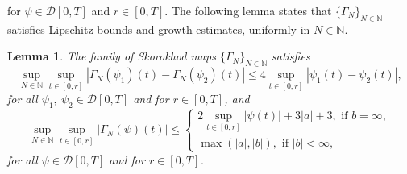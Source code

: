 \documentclass[11pt]{amsart}
\newtheorem{lemma}[theorem]{Lemma}
\begin{document}
{\begin{equation*}
\end{equation*}
for $\psi \in \mathcal{D}[0,T]$ and $r \in [0,T]$. The following lemma states that $\{ \Gamma_{N} \}_{N \in \mathbb{N}}$ satisfies Lipschitz bounds and growth estimates, uniformly in $N \in \mathbb{N}$.
\begin{lemma}\label{lem:GNLipGB}
The family of Skorokhod maps $\{ \Gamma_{N} \}_{N \in \mathbb{N}}$ satisfies
\begin{equation}\label{eq:GNLip}
\sup_{N \in \mathbb{N}} \sup_{t \in [0,r]} |\Gamma_{N}(\psi_{1})(t)-\Gamma_{N}(\psi_{2})(t)| \leq 4 \sup_{t \in [0,r]} |\psi_{1}(t)-\psi_{2}(t)|,
\end{equation}
for all $\psi_{1},\ \psi_{2} \in \mathcal{D}[0,T]$ and for $r \in [0,T]$, and
\begin{equation}\label{eq:GNGB}
\sup_{N \in \mathbb{N}} \sup_{t \in [0,r]} |\Gamma_{N}(\psi)(t)| \leq
\begin{cases}
2 \sup_{t \in [0,r]} |\psi(t)| + 3 |a| + 3, \text{ if } b = \infty,\\
\max(|a|,|b|), \text{ if } |b| < \infty,
\end{cases}
\end{equation}
for all $\psi \in \mathcal{D}[0,T]$ and for $r \in [0,T]$.
\end{lemma}

}
\end{document}
